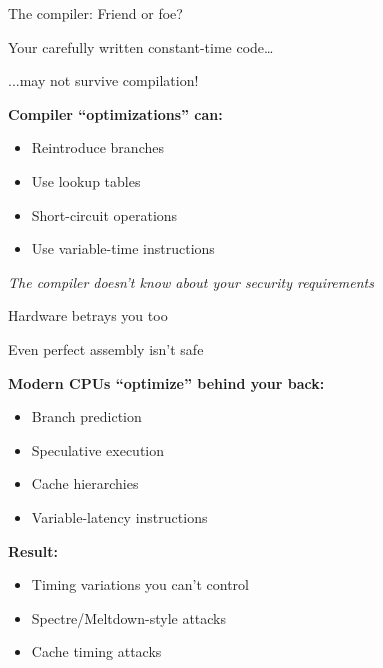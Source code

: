 \documentclass[aspectratio=169, lualatex, handout]{beamer}
\begin{document}
\begin{frame}{The compiler: Friend or foe?}
	\begin{center}
		\Large
		Your carefully written constant-time code\ldots

		\vspace{0.5em}

		...may not survive compilation!
	\end{center}
	\vspace{1em}
	\textbf{Compiler ``optimizations'' can:}
	\begin{itemize}
		\item Reintroduce branches
		\item Use lookup tables
		\item Short-circuit operations
		\item Use variable-time instructions
	\end{itemize}
	\vspace{0.5em}
	\begin{center}
		\textit{The compiler doesn't know about your security requirements}
	\end{center}
\end{frame}

\begin{frame}{Hardware betrays you too}
	\begin{center}
		\Large
		Even perfect assembly isn't safe
	\end{center}
	\vspace{1em}
	\textbf{Modern CPUs ``optimize'' behind your back:}
	\begin{itemize}
		\item Branch prediction
		\item Speculative execution
		\item Cache hierarchies
		\item Variable-latency instructions
	\end{itemize}
	\vspace{0.5em}
	\textbf{Result:}
	\begin{itemize}
		\item Timing variations you can't control
		\item Spectre/Meltdown-style attacks
		\item Cache timing attacks
	\end{itemize}
\end{frame}
\end{document}
